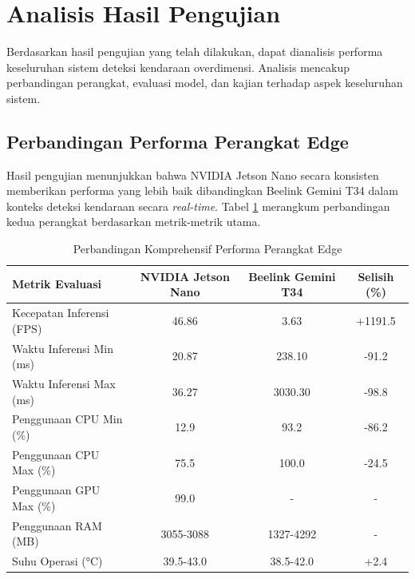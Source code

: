 
\section{Analisis Hasil Pengujian}
\label{sec:analisis}

Berdasarkan hasil pengujian yang telah dilakukan, dapat dianalisis performa keseluruhan sistem deteksi kendaraan overdimensi. Analisis mencakup perbandingan perangkat, evaluasi model, dan kajian terhadap aspek keseluruhan sistem.

\subsection{Perbandingan Performa Perangkat Edge}

Hasil pengujian menunjukkan bahwa NVIDIA Jetson Nano secara konsisten memberikan performa yang lebih baik dibandingkan Beelink Gemini T34 dalam konteks deteksi kendaraan secara \emph{real-time}. Tabel \ref{tab:perangkat_comparison} merangkum perbandingan kedua perangkat berdasarkan metrik-metrik utama.

\begin{table}[htbp]
  \centering
  \caption{Perbandingan Komprehensif Performa Perangkat Edge}
  \label{tab:perangkat_comparison}
  \setlength{\tabcolsep}{4pt}
  \small
  \begin{tabular}{|l|c|c|c|}
  \hline
  \rowcolor[HTML]{C0C0C0}
  \textbf{Metrik Evaluasi} & \textbf{NVIDIA Jetson Nano} & \textbf{Beelink Gemini T34} & \textbf{Selisih (\%)} \\
  \hline
  Kecepatan Inferensi (FPS) & 46.86 & 3.63 & +1191.5 \\
  \hline
  Waktu Inferensi Min (ms) & 20.87 & 238.10 & -91.2 \\
  \hline
  Waktu Inferensi Max (ms) & 36.27 & 3030.30 & -98.8 \\
  \hline
  Penggunaan CPU Min (\%) & 12.9 & 93.2 & -86.2 \\
  \hline
  Penggunaan CPU Max (\%) & 75.5 & 100.0 & -24.5 \\
  \hline
  Penggunaan GPU Max (\%) & 99.0 & - & - \\
  \hline
  Penggunaan RAM (MB) & 3055-3088 & 1327-4292 & - \\
  \hline
  Suhu Operasi (°C) & 39.5-43.0 & 38.5-42.0 & +2.4 \\
  \hline
  \end{tabular}
\end{table}

